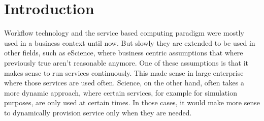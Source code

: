 \chapter{Introduction}

Workflow technology and the service based computing paradigm were mostly used in a business context until now.
But slowly they are extended to be used in other fields, such as eScience, where business centric assumptions that where previously true aren't reasonable anymore.
One of these assumptions is that it makes sense to run services continuously.
This made sense in large enterprise where those services are used often.
Science, on the other hand, often takes a more dynamic approach, where certain services, for example for simulation purposes, are only used at certain times.
In those cases, it would make more sense to dynamically provision service only when they are needed.



